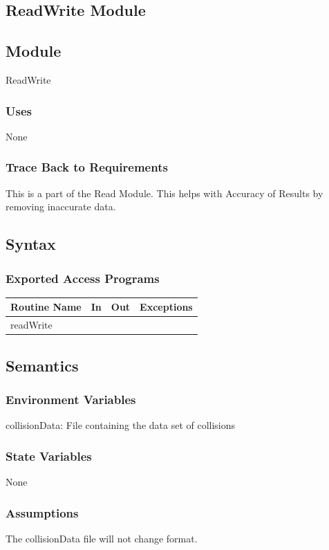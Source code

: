 \documentclass[12pt]{article}
\begin{document}
\subsection{ReadWrite Module}
\subsection*{Module}
ReadWrite

\subsubsection*{Uses}
None

\subsubsection*{Trace Back to Requirements}
This is a part of the Read Module. This helps with Accuracy of Results by removing inaccurate data.

\subsection*{Syntax}
\subsubsection*{Exported Access Programs}
    \begin{tabular}{|l|l|l|l|}
    \hline
    \textbf{Routine Name} & \textbf{In} & \textbf{Out} & \textbf{Exceptions}\\
    \hline
    readWrite & ~ & ~ & ~\\
    \hline
    \end{tabular}
    
\subsection*{Semantics}
\subsubsection*{Environment Variables}
collisionData: File containing the data set of collisions

\subsubsection*{State Variables}
None

\subsubsection*{Assumptions}
The collisionData file will not change format.
\end{document}
